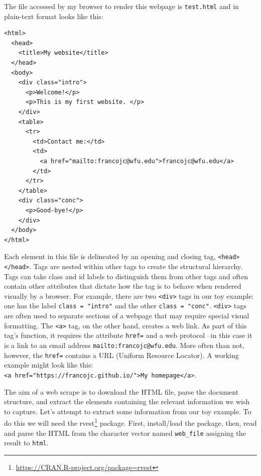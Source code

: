 \documentclass[
]{article}
\DeclareRobustCommand{\href}[2]{#2\footnote{\url{#1}}}
\begin{document}
The file accessed by my browser to render this webpage is \texttt{test.html} and in plain-text format looks like this:

\begin{verbatim}
<html>
  <head>
    <title>My website</title>
  </head>
  <body>
    <div class="intro">
      <p>Welcome!</p>
      <p>This is my first website. </p>
    </div>
    <table>
      <tr>
        <td>Contact me:</td>
        <td>
          <a href="mailto:francojc@wfu.edu">francojc@wfu.edu</a>
        </td>
      </tr>
    </table>
    <div class="conc">
      <p>Good-bye!</p>
    </div>
  </body>
</html>
\end{verbatim}

Each element in this file is delineated by an opening and closing tag, \texttt{\textless{}head\textgreater{}\textless{}/head\textgreater{}}. Tags are nested within other tags to create the structural hierarchy. Tags can take class and id labels to distinguish them from other tags and often contain other attributes that dictate how the tag is to behave when rendered visually by a browser. For example, there are two \texttt{\textless{}div\textgreater{}} tags in our toy example: one has the label \texttt{class\ =\ "intro"} and the other \texttt{class\ =\ "conc"}. \texttt{\textless{}div\textgreater{}} tags are often used to separate sections of a webpage that may require special visual formatting. The \texttt{\textless{}a\textgreater{}} tag, on the other hand, creates a web link. As part of this tag's function, it requires the attribute \texttt{href=} and a web protocol --in this case it is a link to an email address \texttt{mailto:francojc@wfu.edu}. More often than not, however, the \texttt{href=} contains a URL (Uniform Resource Locator). A working example might look like this: \texttt{\textless{}a\ href="https://francojc.github.io/"\textgreater{}My\ homepage\textless{}/a\textgreater{}}.

The aim of a web scrape is to download the HTML file, parse the document structure, and extract the elements containing the relevant information we wish to capture. Let's attempt to extract some information from our toy example. To do this we will need the \href{https://CRAN.R-project.org/package=rvest}{rvest}\citep{R-rvest} package. First, install/load the package, then, read and parse the HTML from the character vector named \texttt{web\_file} assigning the result to \texttt{html}.
\end{document}
